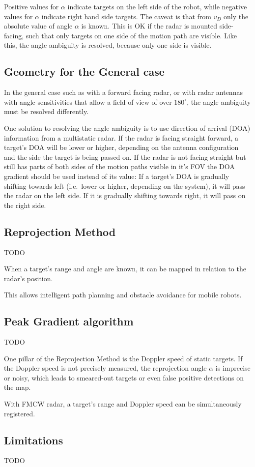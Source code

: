 Positive values for \(\alpha\) indicate targets on the left side of the
robot, while negative values for \(\alpha\) indicate right hand side
targets. The caveat is that from \(v_D\) only the absolute value of
angle \(\alpha\) is known. This is OK if the radar is mounted
side-facing, such that only targets on one side of the motion path are
visible. Like this, the angle ambiguity is resolved, because only one
side is visible.

\subsection{Geometry for the General
case}\label{geometry-for-the-general-case}

In the general case such as with a forward facing radar, or with radar
antennas with angle sensitivities that allow a field of view of over
\(180^\circ\), the angle ambiguity must be resolved differently.

One solution to resolving the angle ambiguity is to use direction of
arrival (DOA) information from a multistatic radar. If the radar is
facing straight forward, a target's DOA will be lower or higher,
depending on the antenna configuration and the side the target is being
passed on. If the radar is not facing straight but still has parts of
both sides of the motion paths visible in it's FOV the DOA gradient
should be used instead of its value: If a target's DOA is gradually
shifting towards left (i.e.~lower or higher, depending on the system),
it will pass the radar on the left side. If it is gradually shifting
towards right, it will pass on the right side.

\subsection{Reprojection Method}\label{reprojection-method}

TODO

When a target's range and angle are known, it can be mapped in relation
to the radar's position.

This allows intelligent path planning and obstacle avoidance for mobile
robots.



\subsection{Peak Gradient algorithm}\label{peak-gradient-algorithm}

TODO

One pillar of the Reprojection Method is the Doppler speed of static
targets. If the Doppler speed is not precisely measured, the
reprojection angle \(\alpha\) is imprecise or noisy, which leads to
smeared-out targets or even false positive detections on the map.

With FMCW radar, a target's range and Doppler speed can be
simultaneously registered.

\subsection{Limitations}\label{limitations}


TODO
